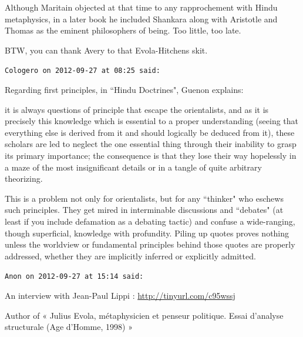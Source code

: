 \begin{footnotesize}
\begin{sffamily}
Although Maritain objected at that time to any rapprochement with Hindu metaphysics, in a later book he included Shankara along with Aristotle and Thomas as the eminent philosophers of being. Too little, too late.

BTW, you can thank Avery to that Evola-Hitchens skit.


\hfill

\texttt{Cologero on 2012-09-27 at 08:25 said: }

Regarding first principles, in ``Hindu Doctrines", Guenon explains:

\begin{quotex}
it is always questions of principle that escape the orientalists, and as it is precisely this knowledge which is essential to a proper understanding (seeing that everything else is derived from it and should logically be deduced from it), these scholars are led to neglect the one essential thing through their inability to grasp its primary importance; the consequence is that they lose their way hopelessly in a maze of the most insignificant details or in a tangle of quite arbitrary theorizing. 

\end{quotex}
This is a problem not only for orientalists, but for any ``thinker" who eschews such principles. They get mired in interminable discussions and ``debates" (at least if you include defamation as a debating tactic) and confuse a wide-ranging, though superficial, knowledge with profundity. Piling up quotes proves nothing unless the worldview or fundamental principles behind those quotes are properly addressed, whether they are implicitly inferred or explicitly admitted.


\hfill

\texttt{Anon on 2012-09-27 at 15:14 said: }

An interview with Jean-Paul Lippi : \url{http://tinyurl.com/c95wssj}

Author of « Julius Evola, métaphysicien et penseur politique. Essai d'analyse structurale (Age d'Homme, 1998) »


\end{sffamily}\end{footnotesize}
